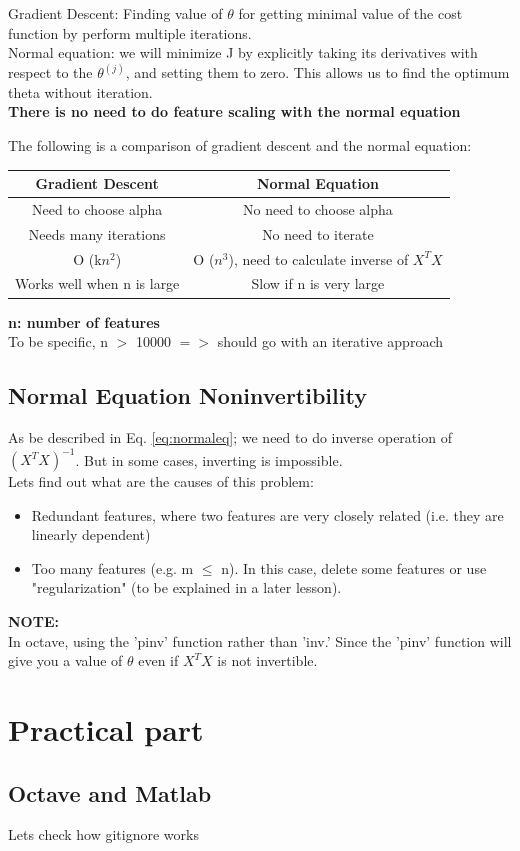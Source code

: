 Gradient Descent: Finding value of $\theta$ for getting minimal value of the cost function by perform multiple iterations. \\
Normal equation: we will minimize J by explicitly taking its derivatives with respect to the $\theta^{(j)}$, and setting them to zero. This allows us to find the optimum theta without iteration. \\

\textbf{There is no need to do feature scaling with the normal equation}

The following is a comparison of gradient descent and the normal equation:
\begin{table}[h]
	\centering
	\begin{tabular}{|c|c|}
		\toprule 
	Gradient Descent &	Normal Equation \\ \midrule
	Need to choose alpha &	No need to choose alpha \\
	Needs many iterations &	No need to iterate \\
	O (k$n^2$)	& O ($n^3$), need to calculate inverse of $X^TX$ \\
	Works well when n is large &	Slow if n is very large \\
	\bottomrule
\end{tabular}
\end{table}

\textbf{n: number of features}\\
To be specific, n $>$ 10000 $=>$ should go with an iterative approach

\subsection{Normal Equation Noninvertibility}
As be described in Eq. \ref{eq:normaleq}; we need to do inverse operation of $(X^TX)^{-1}$. But in some cases, inverting is impossible. \\
Lets find out what are the causes of this problem:
\begin{itemize}
	\item Redundant features, where two features are very closely related (i.e. they are linearly dependent)
	\item Too many features (e.g. m $\leq$ n). In this case, delete some features or use "regularization" (to be explained in a later lesson).
\end{itemize}

\textbf{NOTE:} \\
In octave, using the 'pinv' function rather than 'inv.' Since the 'pinv' function will give you a value of $\theta$ even if $X^TX$ is not invertible.

\section{Practical part}
\subsection{Octave and Matlab}
Lets check how gitignore works
